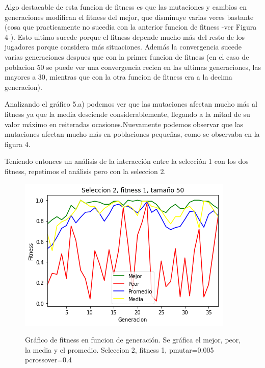 \documentclass[A4paper,oneside,fleqn,11pt]{article}
\theoremstyle{definition}
\begin{document}
Algo destacable de esta funcion de fitness es que las mutaciones y cambios en generaciones modifican el fitness del mejor, que disminuye varias veces bastante (cosa que practicamente no sucedia con la anterior funcion de fitness -ver Figura 4-). Esto ultimo sucede porque el fitness depende mucho más del resto de los jugadores porque considera más situaciones. Además la convergencia sucede varias generaciones despues que con la primer funcion de fitness (en el caso de poblacion 50 se puede ver una convergencia recien en las ultimas generaciones, las mayores a 30, mientras que con la otra funcion de fitness era a la decima generacion). 

Analizando el gráfico 5.a) podemos ver que las mutaciones afectan mucho más al fitness ya que la media desciende considerablemente, llegando a la mitad de su valor máximo en reiteradas ocasiones.Nuevamente podemos observar que las mutaciones afectan mucho más en poblaciones pequeñas, como se observaba en la figura 4.

Teniendo entonces un análisis de la interacción entre la selección 1 con los dos fitness, repetimos el análisis pero con la seleccion 2.



\begin{figure}[H]
	\captionsetup[subfigure]{position=b}
	\centering
		{\includegraphics[width=0.3\linewidth]{s2f1t50.png}}
	\caption{Gráfico de fitness en funcion de generación. Se gráfica el mejor, peor, la media y el promedio. Seleccion 2, fitness 1, pmutar=0.005 pcrossover=0.4}
\end{figure}
\end{document}
